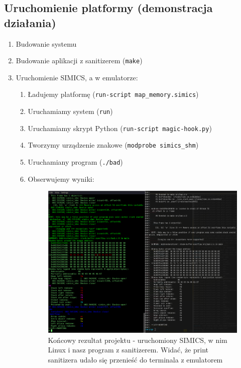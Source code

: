 \documentclass[../main.tex]{subfiles}
\begin{document}
\subsection{Uruchomienie platformy (demonstracja działania)}

\begin{enumerate}
	\item Budowanie systemu
	\item Budowanie aplikacji z sanitizerem (\texttt{make})
	
	\item Uruchomienie SIMICS, a w emulatorze:
	\begin{enumerate}
		\item Ładujemy platformę (\texttt{run-script map_memory.simics})
		\item Uruchamiamy system (\texttt{run})
		\item Uruchamiamy skrypt Python (\texttt{run-script magic-hook.py})
		\item Tworzymy urządzenie znakowe (\texttt{modprobe simics_shm})
		\item Uruchamiany program (\texttt{./bad})
		\item Obserwujemy wyniki:
			\begin{figure}
				\centering
				\includegraphics[width=\linewidth]{images/end}
				\caption{Końcowy rezultat projektu - uruchomiony SIMICS, w nim Linux i nasz program z sanitizerem. Widać, że print sanitizera udało się przenieść do terminala z emulatorem}
				\label{fig:end}
			\end{figure}
	\end{enumerate}
\end{enumerate}
\end{document}
